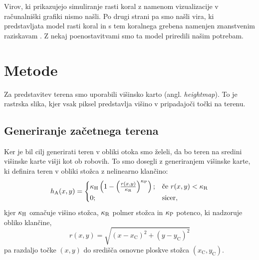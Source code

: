 \documentclass[9pt]{style/friteza}
\begin{document}
Virov, ki prikazujejo simuliranje rasti koral z namenom vizualizacije v računalniški grafiki nismo našli. Po drugi strani pa smo našli vira, ki predstavljata model rasti koral in s tem koralnega grebena namenjen znanstvenim raziskavam \cite{nakamura_reef_model_07,nakamura_reef_simulation_11}. Z nekaj poenostavitvami smo ta model priredili našim potrebam.

\section{Metode}\label{sec:metode}
Za predstavitev terena smo uporabili višinsko karto (angl. \emph{heightmap}). To je rastrska slika, kjer vsak piksel predstavlja višino v pripadajoči točki na terenu.

\subsection{Generiranje začetnega terena}
Ker je bil cilj generirati teren v obliki otoka smo želeli, da bo teren na sredini višinske karte višji kot ob robovih. To smo dosegli z generiranjem višinske karte, ki definira teren v obliki stožca z nelinearno klančino:
\begin{equation} \label{eq:stozec}
h_\mathrm{A}(x,y) =
\begin{cases}
{\ensuremath{\kappa_\mathrm{H}}} \left(1-\left(\frac{r(x,y)}{{\kappa_\mathrm{R}}}\right)^{\kappa_\mathrm{P}}\right); &\text{če } r(x,y) < {\kappa_\mathrm{R}}\\
0; &\text{sicer,} \\
\end{cases}
\end{equation}
kjer ${\kappa_\mathrm{H}}$ označuje višino stožca, ${\kappa_\mathrm{R}}$ polmer stožca in ${\kappa_\mathrm{P}}$ potenco, ki nadzoruje obliko klančine,
\begin{equation} \label{eq:dist_to_center}
r(x,y) = \sqrt{(x - x_\mathrm{C})^2 + (y - y_\mathrm{C})^2}
\end{equation}
pa razdaljo točke $(x,y)$ do središča osnovne ploskve stožca $(x_\mathrm{C},y_\mathrm{C})$.
\end{document}
